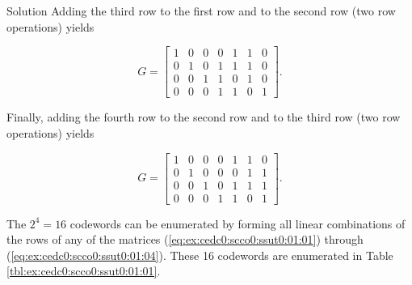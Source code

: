 \begin{vworkexampleparsection}{Solution}
Adding the third row to the first row and to the second row (two
row operations) yields

\begin{equation}
\label{eq:ex:cedc0:scco0:ssut0:01:03}
G = \left[
    \begin{array}{ccccccc}
      1 &   0 &   0 &   0 &   1 &   1 &   0    \\
      0 &   1 &   0 &   1 &   1 &   1 &   0    \\
      0 &   0 &   1 &   1 &   0 &   1 &   0    \\
      0 &   0 &   0 &   1 &   1 &   0 &   1
    \end{array}
    \right] .
\end{equation}

Finally, adding the fourth row to the second row and to the third row (two
row operations) yields

\begin{equation}
\label{eq:ex:cedc0:scco0:ssut0:01:04}
G = \left[
    \begin{array}{ccccccc}
      1 &   0 &   0 &   0 &   1 &   1 &   0    \\
      0 &   1 &   0 &   0 &   0 &   1 &   1    \\
      0 &   0 &   1 &   0 &   1 &   1 &   1    \\
      0 &   0 &   0 &   1 &   1 &   0 &   1
    \end{array}
    \right] .
\end{equation}

The $2^4 = 16$ codewords can be enumerated by forming all linear combinations
of the rows of any of the matrices 
(\ref{eq:ex:cedc0:scco0:ssut0:01:01})
through (\ref{eq:ex:cedc0:scco0:ssut0:01:04}).  These 16 codewords are
enumerated in Table \ref{tbl:ex:cedc0:scco0:ssut0:01:01}.


\end{vworkexampleparsection}
